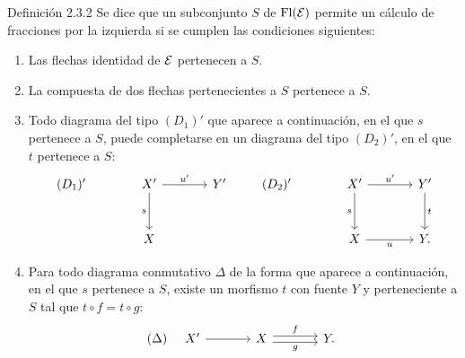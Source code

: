 \begin{statement}{Definición 2.3.2}
Se dice que un subconjunto $S$ de $\operatorname{Fl}(\mathcal E)$ permite un cálculo de fracciones por la izquierda si se cumplen las condiciones siguientes:
\begin{enumerate}[label=(\alph*)]
\item[(a')] Las flechas identidad de $\mathcal E$ pertenecen a $S$.
\item[(b')] La compuesta de dos flechas pertenecientes a $S$ pertenece a $S$.
\item[(c')] Todo diagrama del tipo $(D_1)'$ que aparece a continuación, en el que $s$ pertenece a $S$, puede completarse en un diagrama del tipo $(D_2)'$, en el que $t$ pertenece a $S$:
\[
\begin{tikzcd}[column sep=large,row sep=large]
(D_1)'& X' \arrow[r,"u'"] \arrow[d,"s"'] & Y'\\
& X
\end{tikzcd}
\qquad
\begin{tikzcd}[column sep=large,row sep=large]
(D_2)'& X' \arrow[r,"u'"] \arrow[d,"s"'] & Y' \arrow[d,"t"]\\
& X \arrow[r,"u"'] & Y .
\end{tikzcd}
\]
\item[(d')] Para todo diagrama conmutativo $\Delta$ de la forma que aparece a continuación, en el que $s$ pertenece a $S$, existe un morfismo $t$ con fuente $Y$ y perteneciente a $S$ tal que $t\circ f=t\circ g$:
\[
(\Delta)\quad
\begin{tikzcd}[column sep=large]
X' \arrow[r] & X \arrow[r,shift left,"f"] \arrow[r,shift right,"g"'] & Y .
\end{tikzcd}
\]
\end{enumerate}
\end{statement}
